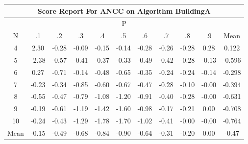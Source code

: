 \documentclass[11pt,a4paper]{report}
\begin{document}
\begin{longtable}{ | c || c | c | c | c | c | c | c | c | c || c |}
\hline
\multicolumn{11}{|c|}{ Score Report For ANCC on Algorithm BuildingA} \\
\hline
\multicolumn{11}{|c|}{ P } \\
\hline
N & .1 & .2 & .3 & .4 & .5 & .6 & .7 & .8 & .9 & Mean\\
 \hline
 \hline
 \endhead
  4 &  \cellcolor[HTML]{C7C7FF} 2.30 &  \cellcolor[HTML]{FFF7F7} -0.28 &  \cellcolor[HTML]{FFFFFF} -0.09 &  \cellcolor[HTML]{FFFFFF} -0.15 &  \cellcolor[HTML]{FFFFFF} -0.14 &  \cellcolor[HTML]{FFF7F7} -0.28 &  \cellcolor[HTML]{FFF7F7} -0.26 &  \cellcolor[HTML]{FFF7F7} -0.28 &  \cellcolor[HTML]{F7F7FF} 0.28 & 0.122 \\
  5 &  \cellcolor[HTML]{FFC7C7} -2.38 &  \cellcolor[HTML]{FFEFEF} -0.57 &  \cellcolor[HTML]{FFF7F7} -0.41 &  \cellcolor[HTML]{FFF7F7} -0.37 &  \cellcolor[HTML]{FFF7F7} -0.33 &  \cellcolor[HTML]{FFEFEF} -0.49 &  \cellcolor[HTML]{FFF7F7} -0.42 &  \cellcolor[HTML]{FFF7F7} -0.28 &  \cellcolor[HTML]{FFFFFF} -0.13 & -0.596 \\
  6 &  \cellcolor[HTML]{F7F7FF} 0.27 &  \cellcolor[HTML]{FFEFEF} -0.71 &  \cellcolor[HTML]{FFFFFF} -0.14 &  \cellcolor[HTML]{FFEFEF} -0.48 &  \cellcolor[HTML]{FFEFEF} -0.65 &  \cellcolor[HTML]{FFF7F7} -0.35 &  \cellcolor[HTML]{FFF7F7} -0.24 &  \cellcolor[HTML]{FFF7F7} -0.24 &  \cellcolor[HTML]{FFFFFF} -0.14 & -0.298 \\
  7 &  \cellcolor[HTML]{FFF7F7} -0.23 &  \cellcolor[HTML]{FFF7F7} -0.34 &  \cellcolor[HTML]{FFE7E7} -0.85 &  \cellcolor[HTML]{FFEFEF} -0.60 &  \cellcolor[HTML]{FFEFEF} -0.67 &  \cellcolor[HTML]{FFF7F7} -0.47 &  \cellcolor[HTML]{FFF7F7} -0.28 &  \cellcolor[HTML]{FFFFFF} -0.10 &  \cellcolor[HTML]{FFFFFF} -0.00 & -0.394 \\
  8 &  \cellcolor[HTML]{FFEFEF} -0.55 &  \cellcolor[HTML]{FFF7F7} -0.47 &  \cellcolor[HTML]{FFEFEF} -0.79 &  \cellcolor[HTML]{FFE7E7} -1.08 &  \cellcolor[HTML]{FFDFDF} -1.20 &  \cellcolor[HTML]{FFE7E7} -0.91 &  \cellcolor[HTML]{FFF7F7} -0.40 &  \cellcolor[HTML]{FFF7F7} -0.28 &  \cellcolor[HTML]{FFFFFF} -0.00 & -0.631 \\
  9 &  \cellcolor[HTML]{FFF7F7} -0.19 &  \cellcolor[HTML]{FFEFEF} -0.61 &  \cellcolor[HTML]{FFDFDF} -1.19 &  \cellcolor[HTML]{FFDFDF} -1.42 &  \cellcolor[HTML]{FFD7D7} -1.60 &  \cellcolor[HTML]{FFE7E7} -0.98 &  \cellcolor[HTML]{FFF7F7} -0.17 &  \cellcolor[HTML]{FFF7F7} -0.21 &  \cellcolor[HTML]{FFFFFF} 0.00 & -0.708 \\
  10 &  \cellcolor[HTML]{FFF7F7} -0.24 &  \cellcolor[HTML]{FFF7F7} -0.43 &  \cellcolor[HTML]{FFDFDF} -1.29 &  \cellcolor[HTML]{FFCFCF} -1.78 &  \cellcolor[HTML]{FFD7D7} -1.70 &  \cellcolor[HTML]{FFE7E7} -1.02 &  \cellcolor[HTML]{FFF7F7} -0.41 &  \cellcolor[HTML]{FFFFFF} -0.00 &  \cellcolor[HTML]{FFFFFF} -0.00 & -0.764 \\
 \hline
 \hline
Mean &  \cellcolor[HTML]{FFFFFF} -0.15 &  \cellcolor[HTML]{FFEFEF} -0.49 &  \cellcolor[HTML]{FFEFEF} -0.68 &  \cellcolor[HTML]{FFE7E7} -0.84 &  \cellcolor[HTML]{FFE7E7} -0.90 &  \cellcolor[HTML]{FFEFEF} -0.64 &  \cellcolor[HTML]{FFF7F7} -0.31 &  \cellcolor[HTML]{FFF7F7} -0.20 &  \cellcolor[HTML]{FFFFFF} 0.00 &  \cellcolor[HTML]{FFF7F7} -0.47
\end{longtable}
\end{document}
